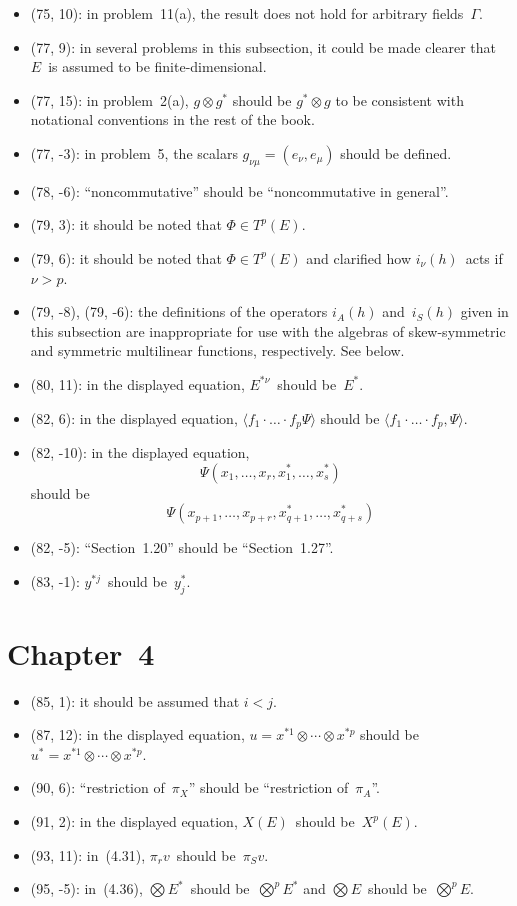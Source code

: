 \documentclass[letterpaper,12pt]{article}
\newcommand{\tprod}{\otimes}
\newcommand{\bigtprod}{\bigotimes}
\newcommand{\sprod}[2]{\langle#1,#2\rangle}
\newcommand{\iprod}[2]{(#1,#2)}
\begin{document}
\begin{itemize}
\item (75, 10): in problem~11(a), the result does not hold for arbitrary fields~\(\Gamma\).
\item (77, 9): in several problems in this subsection, it could be made clearer that \(E\)~is assumed to be finite-dimensional.
\item (77, 15): in problem~2(a), \(g\tprod g^*\) should be \(g^*\tprod g\) to be consistent with notational conventions in the rest of the book.
\item (77, -3): in problem~5, the scalars \(g_{\nu\mu}=\iprod{e_{\nu}}{e_{\mu}}\) should be defined.
\item (78, -6): ``noncommutative'' should be ``noncommutative in general''.
\item (79, 3): it should be noted that \(\Phi\in T^p(E)\).
\item (79, 6): it should be noted that \(\Phi\in T^p(E)\) and clarified how \(i_{\nu}(h)\)~acts if \(\nu>p\).
\item (79, -8), (79, -6): the definitions of the operators \(i_A(h)\) and~\(i_S(h)\) given in this subsection are inappropriate for use with the algebras of skew-symmetric and symmetric multilinear functions, respectively. See below.
\item (80, 11): in the displayed equation, \(E^{*\nu}\)~should be~\(E^*\).
\item (82, 6): in the displayed equation, \(\langle f_1\cdot\ldots\cdot f_p\Psi\rangle\) should be \(\sprod{f_1\cdot\ldots\cdot f_p}{\Psi}\).
\item (82, -10): in the displayed equation,
\[\Psi(x_1,\ldots,x_r,x^*_1,\ldots,x^*_s)\]
should be
\[\Psi(x_{p+1},\ldots,x_{p+r},x^*_{q+1},\ldots,x^*_{q+s})\]
\item (82, -5): ``Section~1.20'' should be ``Section~1.27''.
\item (83, -1): \(y^{*j}\)~should be~\(y^*_j\).
\end{itemize}

\section*{Chapter~4}
\begin{itemize}
\item (85, 1): it should be assumed that \(i<j\).
\item (87, 12): in the displayed equation, \(u=x^{*1}\tprod\cdots\tprod x^{*p}\) should be \(u^*=x^{*1}\tprod\cdots\tprod x^{*p}\).
\item (90, 6): ``restriction of~\(\pi_X\)'' should be ``restriction of~\(\pi_A\)''.
\item (91, 2): in the displayed equation, \(X(E)\)~should be~\(X^p(E)\).
\item (93, 11): in~(4.31), \(\pi_r v\)~should be~\(\pi_S v\).
\item (95, -5): in~(4.36), \(\bigtprod E^*\)~should be~\(\bigtprod^p E^*\) and \(\bigtprod E\)~should be~\(\bigtprod^p E\).
\end{itemize}
\end{document}
